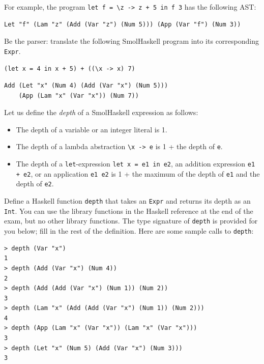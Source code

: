 \documentclass[addpoints]{exam}
\begin{document}
\begin{questions}
For example, the program \verb|let f = \z -> z + 5 in f 3| has the following AST:

\begin{verbatim}
Let "f" (Lam "z" (Add (Var "z") (Num 5))) (App (Var "f") (Num 3))
\end{verbatim}

\question[2] Be the parser: translate the following SmolHaskell program into its corresponding \verb|Expr|.

\begin{verbatim}
(let x = 4 in x + 5) + ((\x -> x) 7)
\end{verbatim}

\begin{solutionorbox}[1.75in]

\begin{verbatim}  
Add (Let "x" (Num 4) (Add (Var "x") (Num 5)))
    (App (Lam "x" (Var "x")) (Num 7))
\end{verbatim}
\end{solutionorbox}

\newpage

\question[5] Let us define the \emph{depth} of a SmolHaskell expression as follows:

\begin{itemize}
\item The depth of a variable or an integer literal is 1.
\item The depth of a lambda abstraction \verb|\x -> e| is 1 + the depth of \verb|e|.  
\item The depth of a \verb|let|-expression \verb|let x = e1 in e2|, an addition expression \verb|e1 + e2|, or an application \verb|e1 e2| is 1 + the maximum of the depth of \verb|e1| and the depth of \verb|e2|.
\end{itemize}

Define a Haskell function \verb|depth| that takes an \verb|Expr| and returns its depth as an \verb|Int|.  You can use the library functions in the Haskell reference at the end of the exam, but no other library functions. The type signature of \verb|depth| is provided for you below; fill in the rest of the definition.  Here are some sample calls to \verb|depth|:

\begin{verbatim}
> depth (Var "x")
1
> depth (Add (Var "x") (Num 4))
2
> depth (Add (Add (Var "x") (Num 1)) (Num 2))
3
> depth (Lam "x" (Add (Add (Var "x") (Num 1)) (Num 2)))
4
> depth (App (Lam "x" (Var "x")) (Lam "x" (Var "x")))
3
> depth (Let "x" (Num 5) (Add (Var "x") (Num 3)))
3
\end{verbatim}


\end{questions}
\end{document}
